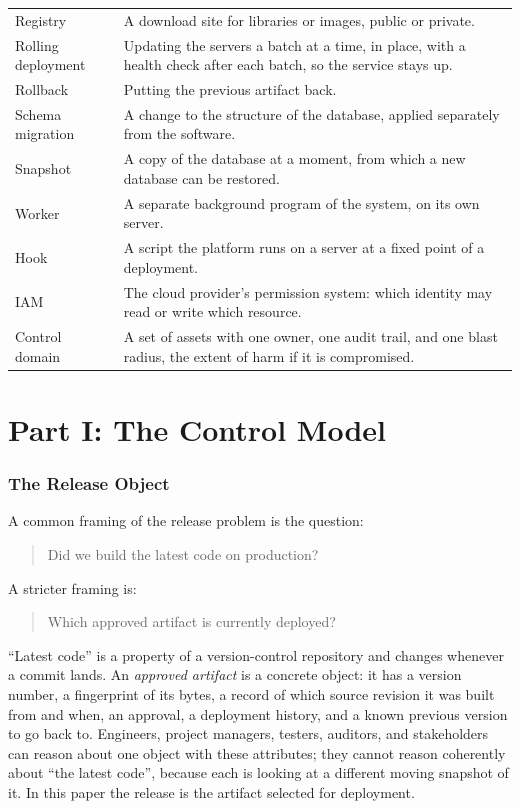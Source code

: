 \documentclass[11pt]{article}
\begin{document}
\begin{center}
\begin{tabularx}{\textwidth}{@{}lX@{}}
Registry & A download site for libraries or images, public or private. \\
Rolling deployment & Updating the servers a batch at a time, in place, with a health check after each batch, so the service stays up. \\
Rollback & Putting the previous artifact back. \\
Schema migration & A change to the structure of the database, applied separately from the software. \\
Snapshot & A copy of the database at a moment, from which a new database can be restored. \\
Worker & A separate background program of the system, on its own server. \\
Hook & A script the platform runs on a server at a fixed point of a deployment. \\
IAM & The cloud provider's permission system: which identity may read or write which resource. \\
Control domain & A set of assets with one owner, one audit trail, and one blast radius, the extent of harm if it is compromised. \\
\bottomrule
\end{tabularx}
\end{center}

\part*{Part I: The Control Model}

\section{The Release Object}

A common framing of the release problem is the question:
\begin{quote}
Did we build the latest code on production?
\end{quote}
A stricter framing is:
\begin{quote}
Which approved artifact is currently deployed?
\end{quote}

``Latest code'' is a property of a version-control repository and changes whenever a commit lands. An \emph{approved artifact} is a concrete object: it has a version number, a fingerprint of its bytes, a record of which source revision it was built from and when, an approval, a deployment history, and a known previous version to go back to. Engineers, project managers, testers, auditors, and stakeholders can reason about one object with these attributes; they cannot reason coherently about ``the latest code'', because each is looking at a different moving snapshot of it. In this paper the release is the artifact selected for deployment.
\end{document}
